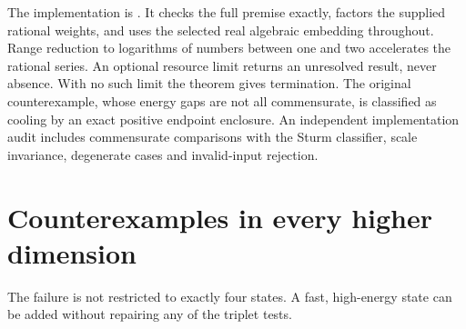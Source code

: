 \documentclass[11pt]{article}
\begin{document}
The implementation is .
It checks the full premise exactly, factors the supplied rational weights,
and uses the selected real algebraic embedding throughout. Range reduction
to logarithms of numbers between one and two accelerates the rational
series. An optional resource limit returns an unresolved result, never
absence. With no such limit the theorem gives termination. The original
counterexample, whose energy gaps are not all commensurate, is classified
as cooling by an exact positive endpoint enclosure. An independent
implementation audit includes commensurate comparisons with the Sturm
classifier, scale invariance, degenerate cases and invalid-input rejection.

\section{Counterexamples in every higher dimension}\label{sec:extension}
The failure is not restricted to exactly four states. A fast, high-energy
state can be added without repairing any of the triplet tests.
\end{document}
